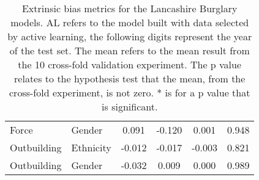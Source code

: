 \begin{table}[]
\begin{tabular}{@{}llcccc@{}}
Force         & Gender    & 0.091                            & -0.120                           & 0.001                    & 0.948                       \\
Outbuilding   & Ethnicity & -0.012                           & -0.017                           & -0.003                   & 0.821                       \\
Outbuilding   & Gender    & -0.032                           & 0.009                            & 0.000                    & 0.989                       \\ \bottomrule
\end{tabular}
\caption{\label{tab:lancs_bias} Extrinsic bias metrics for the Lancashire Burglary models. AL refers to the model built with data selected by active learning, the following digits represent the year of the test set. The mean refers to the mean result from the 10 cross-fold validation experiment. The p value relates to the hypothesis test that the mean, from the cross-fold experiment, is not zero. * is for a p value that is significant.}
\end{table}